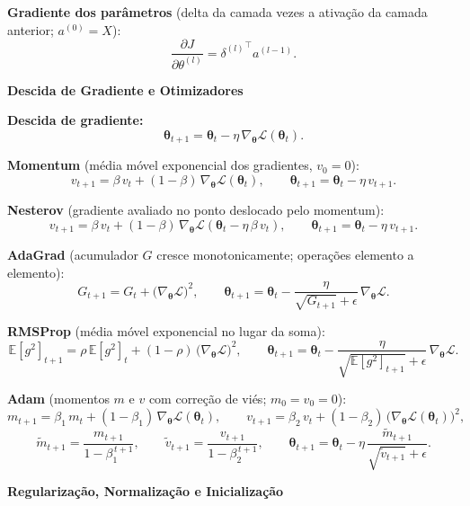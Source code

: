 \documentclass[11pt,a4paper]{article}
\newcommand{\thetav}{\boldsymbol{\theta}}
\newcommand{\bloco}[1]{%
  \par\vspace{0.3em}%
  {\bfseries\large #1}\par%
  \vspace{-0.4em}{\color{gray!60}\rule{\linewidth}{0.4pt}}\par%
}
\begin{document}
\textbf{Gradiente dos parâmetros} (delta da camada vezes a ativação da camada anterior; $a^{(0)} = X$):
\[
  \frac{\partial J}{\partial\theta^{(l)}} = {\delta^{(l)}}^{\top} a^{(l-1)}.
\]

\bloco{Descida de Gradiente e Otimizadores}

\textbf{Descida de gradiente:}
\[
  \thetav_{t+1} = \thetav_{t} - \eta\,\nabla_{\thetav}\mathcal{L}(\thetav_{t}).
\]

\textbf{Momentum} (média móvel exponencial dos gradientes, $v_0 = 0$):
\[
  v_{t+1} = \beta\,v_{t} + (1-\beta)\,\nabla_{\thetav}\mathcal{L}(\thetav_{t}),
  \qquad
  \thetav_{t+1} = \thetav_{t} - \eta\,v_{t+1}.
\]

\textbf{Nesterov} (gradiente avaliado no ponto deslocado pelo momentum):
\[
  v_{t+1} = \beta\,v_{t} + (1-\beta)\,\nabla_{\thetav}\mathcal{L}(\thetav_{t} - \eta\,\beta\,v_{t}),
  \qquad
  \thetav_{t+1} = \thetav_{t} - \eta\,v_{t+1}.
\]

\textbf{AdaGrad} (acumulador $G$ cresce monotonicamente; operações elemento a elemento):
\[
  G_{t+1} = G_{t} + \bigl(\nabla_{\thetav}\mathcal{L}\bigr)^{2},
  \qquad
  \thetav_{t+1} = \thetav_{t} - \frac{\eta}{\sqrt{G_{t+1}} + \epsilon}\,\nabla_{\thetav}\mathcal{L}.
\]

\textbf{RMSProp} (média móvel exponencial no lugar da soma):
\[
  \mathbb{E}[g^{2}]_{t+1} = \rho\,\mathbb{E}[g^{2}]_{t} + (1-\rho)\,\bigl(\nabla_{\thetav}\mathcal{L}\bigr)^{2},
  \qquad
  \thetav_{t+1} = \thetav_{t} - \frac{\eta}{\sqrt{\mathbb{E}[g^{2}]_{t+1}} + \epsilon}\,\nabla_{\thetav}\mathcal{L}.
\]

\textbf{Adam} (momentos $m$ e $v$ com correção de viés; $m_0 = v_0 = 0$):
\[
  m_{t+1} = \beta_1\,m_{t} + (1-\beta_1)\,\nabla_{\thetav}\mathcal{L}(\thetav_{t}),
  \qquad
  v_{t+1} = \beta_2\,v_{t} + (1-\beta_2)\,\bigl(\nabla_{\thetav}\mathcal{L}(\thetav_{t})\bigr)^{2},
\]
\[
  \widetilde{m}_{t+1} = \frac{m_{t+1}}{1 - \beta_1^{\,t+1}},
  \qquad
  \widetilde{v}_{t+1} = \frac{v_{t+1}}{1 - \beta_2^{\,t+1}},
  \qquad
  \thetav_{t+1} = \thetav_{t} - \eta\,\frac{\widetilde{m}_{t+1}}{\sqrt{\widetilde{v}_{t+1}} + \epsilon}.
\]

\bloco{Regularização, Normalização e Inicialização}
\end{document}
